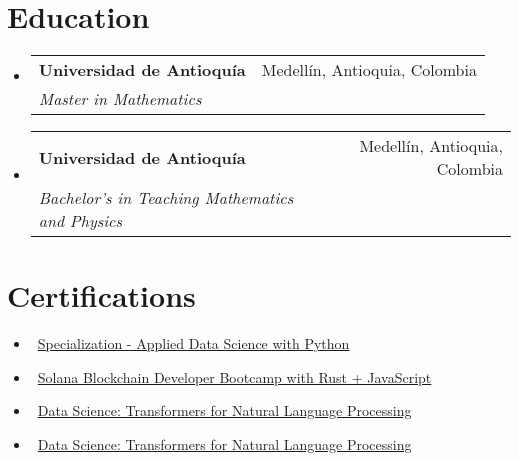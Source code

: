 \documentclass[letterpaper,10pt]{article}
\makeatletter
\newcommand{\resumeItem}[1]{\item\small{#1}}
\newcommand{\resumeSubheading}[4]{
\vspace{-1pt}\item
  \begin{tabular*}{0.97\textwidth}[t]{l@{\extracolsep{\fill}}r}
    \textbf{#1} & #2 \\
    \textit{#3} & \textit{#4} \\
  \end{tabular*}\vspace{-7pt}
}
\newcommand{\resumeSubHeadingList}{\begin{itemize}[leftmargin=0.15in, label={}]}
\newcommand{\resumeSubHeadingListEnd}{\end{itemize}}
\makeatother
\begin{document}
\section{Education}
\resumeSubHeadingList
  \resumeSubheading
      {Universidad de Antioquía}{Medellín, Antioquia, Colombia}
      {Master in Mathematics}{}
  \resumeSubheading
      {Universidad de Antioquía}{Medellín, Antioquia, Colombia}
      {Bachelor's in Teaching Mathematics and Physics}{}
\resumeSubHeadingListEnd

\section{Certifications}
\resumeSubHeadingList
  \resumeItem{\textbullet\ \href{https://www.udemy.com/certificate/UC-6ef198a0-4b61-40aa-83c8-040fd3b870d1/}{Specialization - Applied Data Science with Python}}
  \resumeItem{\textbullet\ \href{https://www.udemy.com/certificate/UC-e9651ea1-29b7-4b82-9a61-8ed38232db47/}{Solana Blockchain Developer Bootcamp with Rust + JavaScript}}
  \resumeItem{\textbullet\ \href{https://www.udemy.com/certificate/UC-f56cb112-3038-494e-904c-a8fb0fba7010/}{Data Science: Transformers for Natural Language Processing}}
    \resumeItem{\textbullet\ \href{https://www.udemy.com/certificate/UC-f56cb112-3038-494e-904c-a8fb0fba7010/}{Data Science: Transformers for Natural Language Processing}}
\resumeSubHeadingListEnd
\end{document}
